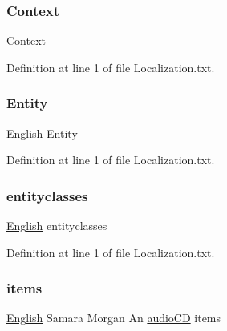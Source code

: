 \subsubsection{\texorpdfstring{Context}{Context}}
{\footnotesize\ttfamily Context}



Definition at line 1 of file Localization.\+txt.

\mbox{\label{_the_01_restless_01_curse_2_config_2_localization_8txt_a831452d5736d8c492ddd792b09c12cde}} 
\subsubsection{\texorpdfstring{Entity}{Entity}}
{\footnotesize\ttfamily \mbox{\hyperlink{_sphere_i_i_01_winter_01_project_2_config_2_localization_8txt_ad896b63205779b1b09e86d941ce13976}{English}} Entity}



Definition at line 1 of file Localization.\+txt.

\mbox{\label{_the_01_restless_01_curse_2_config_2_localization_8txt_ab48b06ed080b302a01ca5ecb66d21827}} 
\subsubsection{\texorpdfstring{entityclasses}{entityclasses}}
{\footnotesize\ttfamily \mbox{\hyperlink{_sphere_i_i_01_winter_01_project_2_config_2_localization_8txt_ad896b63205779b1b09e86d941ce13976}{English}} entityclasses}



Definition at line 1 of file Localization.\+txt.

\mbox{\label{_the_01_restless_01_curse_2_config_2_localization_8txt_ac9f63106d69e66a57567394d6c03cba2}} 
\subsubsection{\texorpdfstring{items}{items}}
{\footnotesize\ttfamily \mbox{\hyperlink{_sphere_i_i_01_winter_01_project_2_config_2_localization_8txt_ad896b63205779b1b09e86d941ce13976}{English}} Samara Morgan An \mbox{\hyperlink{_sphere_i_i_01_music_01_boxes_2_config_2_localization_8txt_ae0a4281bb52a78c638f75d315de5da12}{audio\+CD}} items}



